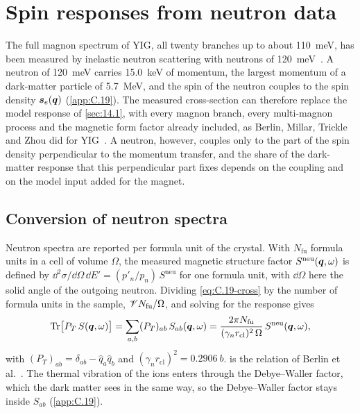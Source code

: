 \section{Spin responses from neutron data}\label{sec:14.4}

The full magnon spectrum of YIG, all twenty branches up to about \SI{110}{meV}, has been measured by inelastic neutron scattering with neutrons of \SI{120}{meV}~\cite{princep2017full,berlin2025determining}. A neutron of \SI{120}{meV} carries \SI{15.0}{keV} of momentum, the largest momentum of a dark-matter particle of \SI{5.7}{MeV}, and the spin of the neutron couples to the spin density $\bm{s}_e(\bm{q})$ (\cref{app:C.19}). The measured cross-section can therefore replace the model response of \cref{sec:14.1}, with every magnon branch, every multi-magnon process and the magnetic form factor already included, as Berlin, Millar, Trickle and Zhou did for YIG~\cite{berlin2025determining}. A neutron, however, couples only to the part of the spin density perpendicular to the momentum transfer, and the share of the dark-matter response that this perpendicular part fixes depends on the coupling and on the model input added for the magnet.

\subsection{Conversion of neutron spectra}

Neutron spectra are reported per formula unit of the crystal. With $N_{\mathrm{fu}}$ formula units in a cell of volume $\Omega$, the measured magnetic structure factor $S^{\mathrm{neu}}(\bm{q},\omega)$ is defined by $\dd^2\sigma/\dd\Omega\,\dd E' = (p'_n/p_n)\,S^{\mathrm{neu}}$ for one formula unit, with $\dd\Omega$ here the solid angle of the outgoing neutron. Dividing \cref{eq:C.19-cross} by the number of formula units in the sample, $\mathscr{V} N_{\mathrm{fu}}/\Omega$, and solving for the response gives
\begin{equation}
  \operatorname{Tr}\bigl[P_T\,S(\bm{q},\omega)\bigr] = \sum_{a,b}(P_T)_{ab}\,S_{ab}(\bm{q},\omega) = \frac{2\pi N_{\mathrm{fu}}}{(\gamma_nr_{\mathrm{cl}})^2\,\Omega}\,S^{\mathrm{neu}}(\bm{q},\omega) ,
  \label{eq:14.4-PT}
\end{equation}
with $(P_T)_{ab} = \delta_{ab} - \hat q_a\hat q_b$ and $(\gamma_nr_{\mathrm{cl}})^2 = \SI{0.2906}{b}$.  is the relation of Berlin et al.~\cite[Eq.~(26)]{berlin2025determining}. The thermal vibration of the ions enters through the Debye--Waller factor, which the dark matter sees in the same way, so the Debye--Waller factor stays inside $S_{ab}$ (\cref{app:C.19}).

